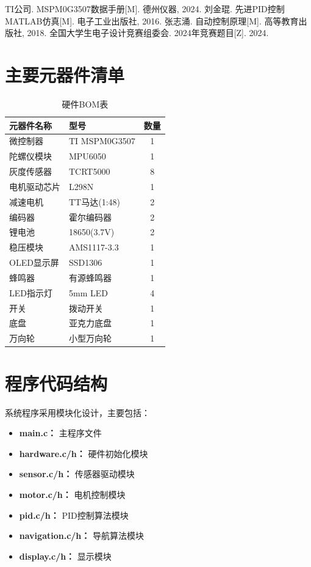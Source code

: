 \documentclass[UTF8]{ctexart}
\begin{document}
\begin{thebibliography}{99}
     TI公司. MSPM0G3507数据手册[M]. 德州仪器, 2024.
     刘金琨. 先进PID控制MATLAB仿真[M]. 电子工业出版社, 2016.
     张志涌. 自动控制原理[M]. 高等教育出版社, 2018.
     全国大学生电子设计竞赛组委会. 2024年竞赛题目[Z]. 2024.
\end{thebibliography}

\appendix
\section{主要元器件清单}
\begin{table}[H]
    \centering
    \caption{硬件BOM表}
    \label{tab:bom}
    \begin{tabular}{llc}
        \toprule
        元器件名称 & 型号 & 数量 \\
        \midrule
        微控制器 & TI MSPM0G3507 & 1 \\
        陀螺仪模块 & MPU6050 & 1 \\
        灰度传感器 & TCRT5000 & 8 \\
        电机驱动芯片 & L298N & 1 \\
        减速电机 & TT马达(1:48) & 2 \\
        编码器 & 霍尔编码器 & 2 \\
        锂电池 & 18650(3.7V) & 2 \\
        稳压模块 & AMS1117-3.3 & 1 \\
        OLED显示屏 & SSD1306 & 1 \\
        蜂鸣器 & 有源蜂鸣器 & 1 \\
        LED指示灯 & 5mm LED & 4 \\
        开关 & 拨动开关 & 1 \\
        底盘 & 亚克力底盘 & 1 \\
        万向轮 & 小型万向轮 & 1 \\
        \bottomrule
    \end{tabular}
\end{table}

\section{程序代码结构}

系统程序采用模块化设计，主要包括：

\begin{itemize}
    \item \textbf{main.c：} 主程序文件
    \item \textbf{hardware.c/h：} 硬件初始化模块
    \item \textbf{sensor.c/h：} 传感器驱动模块
    \item \textbf{motor.c/h：} 电机控制模块
    \item \textbf{pid.c/h：} PID控制算法模块
    \item \textbf{navigation.c/h：} 导航算法模块
    \item \textbf{display.c/h：} 显示模块
\end{itemize}
\end{document}
